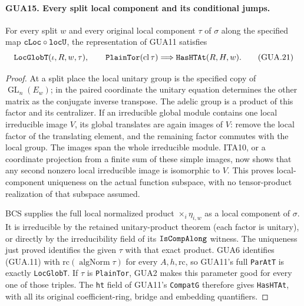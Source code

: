 \documentclass[11pt,a4paper]{article}
\numberwithin{equation}{section}
\theoremstyle{remark}\newtheorem{remark}[theorem]{Remark}
\begin{document}
\paragraph{GUA15. Every split local component and its conditional jumps.}
\label{claim:GUA15}
For every split $w$ and every original local component
$\tau$ of $\sigma$ along the specified map
$\texttt{c\allowbreak Loc}\circ\texttt{loc\allowbreak U}$, the representation
of GUA11 satisfies
\[
       \texttt{Loc\allowbreak Glob\allowbreak T}(\iota,R,w,\tau),\qquad
       \texttt{Plain\allowbreak Tor}(\operatorname{cl}\tau)
                        \Longrightarrow\texttt{Has\allowbreak HTAt}(R,H,w).
                                                        \tag{GUA.21}
\]
\begin{proof}
At a split place the local unitary group is the
specified copy of $\operatorname{GL}_n(E_w)$; in
the paired coordinate the unitary equation determines
the other matrix as the conjugate inverse transpose.
The adelic group is a product of this factor and
its centralizer.  If an irreducible global module
contains one local irreducible image $V$, its global
translates are again images of $V$: remove the local
factor of the translating element, and the remaining
factor commutes with the local group.  The images
span the whole irreducible module.  ITA10, or a
coordinate projection from a finite sum of these
simple images, now shows that any second nonzero
local irreducible image is isomorphic to $V$.
This proves local-component uniqueness on the actual
function subspace, with no tensor-product realization
of that subspace assumed.

BCS supplies the full local normalized product
$\mathop{\times}_i\eta_{i,w}$ as a local component
of $\sigma$.  It is irreducible by the retained
unitary-product theorem (each factor is unitary),
or directly by the irreducibility field of its
$\texttt{Is\allowbreak Comp\allowbreak Along}$ witness.  The uniqueness just
proved identifies the given $\tau$ with that exact
product.  GUA6 identifies (GUA.11) with
$\mathrm{rc}(\operatorname{algNorm}\tau)$ for
every $A,h,\mathrm{rc}$, so GUA11's full
\texttt{Par\allowbreak At\allowbreak T} is exactly \texttt{Loc\allowbreak Glob\allowbreak T}.
If $\tau$ is \texttt{Plain\allowbreak Tor}, GUA2 makes this
parameter good for every one of those triples.
The \texttt{ht} field of GUA11's \texttt{Compat\allowbreak G}
therefore gives \texttt{Has\allowbreak HTAt}, with all its
original coefficient-ring, bridge and embedding quantifiers.
\end{proof}
\end{document}
